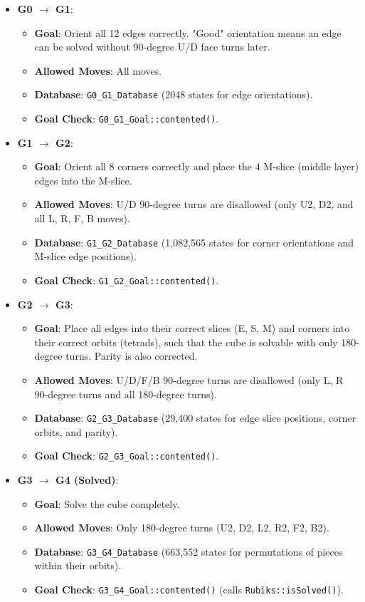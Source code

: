 \documentclass[11pt, a4paper]{article}
\begin{document}
\begin{itemize}
    \item \textbf{G0 $\rightarrow$ G1}:
        \begin{itemize}
            \item \textbf{Goal}: Orient all 12 edges correctly. "Good" orientation means an edge can be solved without 90-degree U/D face turns later.
            \item \textbf{Allowed Moves}: All moves.
            \item \textbf{Database}: \texttt{G0\_G1\_Database} (2048 states for edge orientations).
            \item \textbf{Goal Check}: \texttt{G0\_G1\_Goal::contented()}.
        \end{itemize}
    \item \textbf{G1 $\rightarrow$ G2}:
        \begin{itemize}
            \item \textbf{Goal}: Orient all 8 corners correctly and place the 4 M-slice (middle layer) edges into the M-slice.
            \item \textbf{Allowed Moves}: U/D 90-degree turns are disallowed (only U2, D2, and all L, R, F, B moves).
            \item \textbf{Database}: \texttt{G1\_G2\_Database} (1,082,565 states for corner orientations and M-slice edge positions).
            \item \textbf{Goal Check}: \texttt{G1\_G2\_Goal::contented()}.
        \end{itemize}
    \item \textbf{G2 $\rightarrow$ G3}:
        \begin{itemize}
            \item \textbf{Goal}: Place all edges into their correct slices (E, S, M) and corners into their correct orbits (tetrads), such that the cube is solvable with only 180-degree turns. Parity is also corrected.
            \item \textbf{Allowed Moves}: U/D/F/B 90-degree turns are disallowed (only L, R 90-degree turns and all 180-degree turns).
            \item \textbf{Database}: \texttt{G2\_G3\_Database} (29,400 states for edge slice positions, corner orbits, and parity).
            \item \textbf{Goal Check}: \texttt{G2\_G3\_Goal::contented()}.
        \end{itemize}
    \item \textbf{G3 $\rightarrow$ G4 (Solved)}:
        \begin{itemize}
            \item \textbf{Goal}: Solve the cube completely.
            \item \textbf{Allowed Moves}: Only 180-degree turns (U2, D2, L2, R2, F2, B2).
            \item \textbf{Database}: \texttt{G3\_G4\_Database} (663,552 states for permutations of pieces within their orbits).
            \item \textbf{Goal Check}: \texttt{G3\_G4\_Goal::contented()} (calls \texttt{Rubiks::isSolved()}).
        \end{itemize}
\end{itemize}
\end{document}
